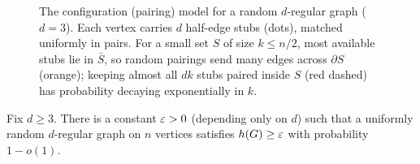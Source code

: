 \begin{figure}[htbp]
\caption{The configuration (pairing) model for a random $d$-regular graph ($d=3$). Each vertex carries $d$ half-edge stubs (dots), matched uniformly in pairs. For a small set $S$ of size $k\le n/2$, most available stubs lie in $\bar S$, so random pairings send many edges across $\partial S$ (orange); keeping almost all $dk$ stubs paired inside $S$ (red dashed) has probability decaying exponentially in $k$.}
\label{ch34:fig-pairing}
\end{figure}

\begin{theorem}
\label{ch34:thm-random-expand}
Fix $d\ge 3$. There is a constant $\varepsilon>0$ (depending only on $d$) such that a uniformly random $d$-regular graph on $n$ vertices satisfies $h(G)\ge\varepsilon$ with probability $1-o(1)$.
\end{theorem}

